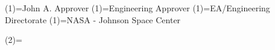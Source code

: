 \docApproverName(1)={John A. Approver}
\docApproverPosition(1)={Engineering Approver}
\docApproverOrganization(1)={EA/Engineering Directorate}
\docApproverLocation(1)={NASA - Johnson Space Center}

\docApproverName(2)={}